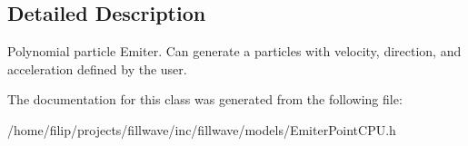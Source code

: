 \subsection{Detailed Description}
Polynomial particle Emiter. Can generate a particles with velocity, direction, and acceleration defined by the user. 

The documentation for this class was generated from the following file\+:\begin{DoxyCompactItemize}
\item 
/home/filip/projects/fillwave/inc/fillwave/models/Emiter\+Point\+C\+P\+U.\+h\end{DoxyCompactItemize}
